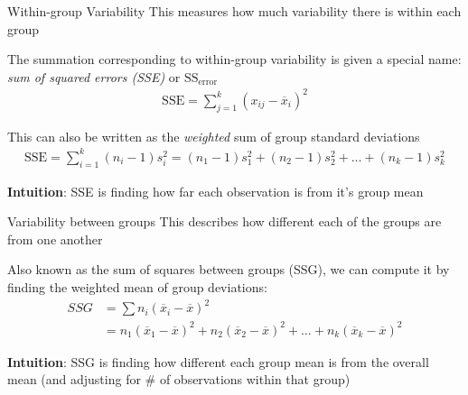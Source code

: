 \documentclass{beamer}
\begin{document}
\begin{frame}{Within-group Variability}
This measures how much variability there is within each group \vspace{6mm}

The summation corresponding to within-group variability is given a special name: \textit{sum of squared errors (SSE)} or $\text{SS}_{\text{error}}$
\begin{align*}
\text{SSE} = \sum_{j=1}^k (x_{ij} - \overline{x}_i)^2
\end{align*} \vspace{2mm}

This can also be written as the \textit{weighted} sum of group standard deviations
\begin{align*}
\text{SSE} = \sum_{i=1}^k (n_i- 1)s_i^2 = (n_1 - 1)s_1^2 + (n_2 - 1)s_2^2 + \dots + (n_k-1)s_k^2
\end{align*} \vspace{4mm}

\textbf{Intuition}: SSE is finding how far each observation is from it's group mean
\end{frame}

\begin{frame}{Variability between groups}
This describes how different each of the groups are from one another \vspace{10mm}

Also known as the sum of squares between groups (SSG), we can compute it by finding the weighted mean of group deviations:
\begin{align*}
SSG &= \sum n_i(\overline{x}_i - \overline{x})^2 \\
&= n_1(\overline{x}_1 - \overline{x})^2 + n_2(\overline{x}_2 - \overline{x})^2 + \dots + n_k(\overline{x}_k - \overline{x})^2
\end{align*} \vspace{4mm}

\textbf{Intuition}: SSG is finding how different each group mean is from the overall mean (and adjusting for \# of observations within that group)

\end{frame}
\end{document}
